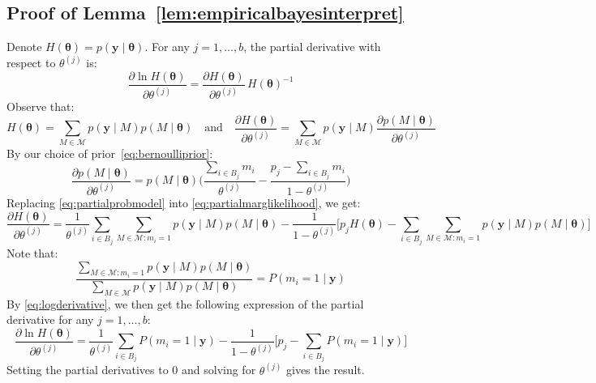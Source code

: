 \documentclass[aos]{imsart}
\theoremstyle{plain}
\newcommand{\bs}{\boldsymbol}
\begin{document}
\begin{supplement}
\subsection{Proof of Lemma~\ref{lem:empiricalbayesinterpret}}
Denote $H(\bs \theta)=p(\bs y \mid \bs \theta)$. For any $j=1,\ldots,b$, the partial derivative with respect to $\theta^{(j)}$ is:
    \begin{equation}\label{eq:logderivative}
        \frac{\partial \ln H(\bs \theta)}{\partial \theta^{(j)}}=\frac{\partial H(\bs \theta)}{\partial \theta^{(j)}}\,H(\boldsymbol{\theta})^{-1}
    \end{equation}
    Observe that:
    \begin{equation}\label{eq:partialmarglikelihood}
    H(\bs \theta)=\sum_{M \in \mathcal{M}}p(\bs y \mid M)p(M \mid \bs \theta)
    \quad \text{and}\quad 
    \frac{\partial H(\bs \theta)}{\partial \theta^{(j)}}=\sum_{M\in \mathcal{M}}p(\bs y \mid M)\frac{\partial p(M \mid \bs \theta)}{\partial \theta^{(j)}}
    \end{equation}
    By our choice of prior~\eqref{eq:bernoulliprior}:
    \begin{equation}\label{eq:partialprobmodel}
    \frac{\partial p(M \mid \bs \theta)}{\partial \theta^{(j)}}= p(M \mid \bs \theta) \bigg(\frac{\sum_{i\in B_j}m_i}{\theta^{(j)}}-\frac{p_j-\sum_{i\in B_j}m_i}{1-\theta^{(j)}} \bigg)        
    \end{equation}
    Replacing \eqref{eq:partialprobmodel} into \eqref{eq:partialmarglikelihood}, we get:
    \begin{equation*}\label{eq:partialmarglikelihood2}
        \frac{\partial H(\bs \theta)}{\partial \theta^{(j)}}=\frac{1}{\theta^{(j)}}\sum_{i \in B_j}\sum_{M\in \mathcal{M}: m_i=1}p(\bs y \mid M)p(M \mid \bs \theta) - \frac{1}{1-\theta^{(j)}}\bigg[p_j H(\bs \theta)-\sum_{i \in B_j}\sum_{M\in \mathcal{M}: m_i=1}p(\bs y \mid M)p(M \mid \bs \theta)
        \bigg]
    \end{equation*}
    Note that:
    $$\frac{\sum_{M\in \mathcal{M}: m_i=1}p(\bs y \mid M)p(M \mid \bs \theta)}{\sum_{M\in \mathcal{M}}p(\bs y \mid M)p(M \mid \bs \theta)} = P(m_i = 1\mid \bs y)$$
    By \eqref{eq:logderivative}, we then get the following expression of the partial derivative for any $j=1,\ldots,b$:
    $$\frac{\partial \ln H(\bs \theta)}{\partial \theta^{(j)}}=\frac{1}{\theta^{(j)}}\sum_{i \in B_j}P(m_i = 1\mid \bs y) - \frac{1}{1-\theta^{(j)}}\bigg[p_j-\sum_{i \in B_j}P(m_i = 1\mid \bs y)
        \bigg]$$
    Setting the partial derivatives to 0 and solving for $\theta^{(j)}$ gives the result.


\end{supplement}
\end{document}
